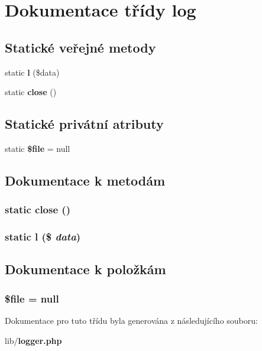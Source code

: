 \section{Dokumentace třídy log}
\label{d7/d89/classlog}
\subsection*{Statické veřejné metody}
\begin{DoxyCompactItemize}
\item 
static {\bf l} (\$data)
\item 
static {\bf close} ()
\end{DoxyCompactItemize}
\subsection*{Statické privátní atributy}
\begin{DoxyCompactItemize}
\item 
static {\bf \$file} = null
\end{DoxyCompactItemize}


\subsection{Dokumentace k metodám}
\subsubsection[{close}]{\setlength{\rightskip}{0pt plus 5cm}static close ()\hspace{0.3cm}{\ttfamily  [static]}}\label{d7/d89/classlog_a1d68d0d72e16e18dfe327f39868b8fb5}
\subsubsection[{l}]{\setlength{\rightskip}{0pt plus 5cm}static l (\$ {\em data})\hspace{0.3cm}{\ttfamily  [static]}}\label{d7/d89/classlog_ab3d41665498e6068ba670b37b3f8efbb}


\subsection{Dokumentace k položkám}
\subsubsection[{\$file}]{\setlength{\rightskip}{0pt plus 5cm}\$file = null\hspace{0.3cm}{\ttfamily  [static, private]}}\label{d7/d89/classlog_aa1bfbd27060176201b271918dff57e8f}


Dokumentace pro tuto třídu byla generována z následujícího souboru:\begin{DoxyCompactItemize}
\item 
lib/{\bf logger.php}\end{DoxyCompactItemize}
